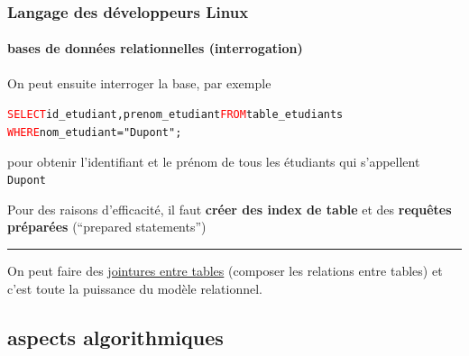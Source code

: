 \documentclass[xcolor=svgnames,final,smaller,a4]{beamer}
\begin{document}
\begin{frame}
  \frametitle{Langage des développeurs Linux}
  \framesubtitle{bases de données relationnelles (interrogation)}

  On peut ensuite interroger la base, par exemple

\begin{relsize}{-1}
\begin{alltt}
  \textcolor{red}{SELECT} id\_etudiant, prenom\_etudiant \textcolor{red}{FROM} table\_etudiants\\
  \hspace{0.5cm}\textcolor{red}{WHERE} nom\_etudiant = "Dupont" ;
\end{alltt}
\end{relsize}

pour obtenir l'identifiant et le prénom de tous les étudiants qui s'appellent \texttt{Dupont}

\vspace{0.5cm}

Pour des raisons d'efficacité, il faut \textbf{créer des index de table} et des \textbf{requêtes préparées} (``prepared statements'')

\vspace{1cm}

\hrule

\vspace{0.2cm}

On peut faire des \href{https://docs.postgresql.fr/12/tutorial-join.html}{jointures entre tables} (composer les relations entre tables) et c'est toute la puissance du modèle relationnel.


\end{frame}



\subsection{aspects algorithmiques}
\end{document}
